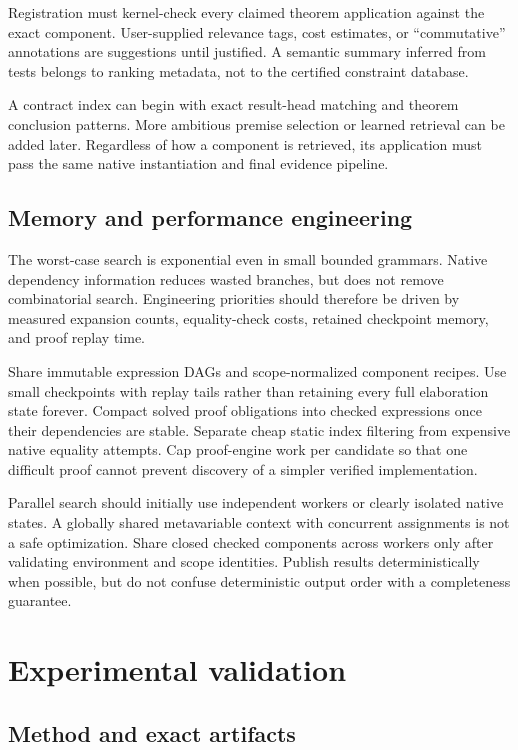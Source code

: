\documentclass[11pt,a4paper]{article}
\theoremstyle{remark}
\begin{document}
Registration must kernel-check every claimed theorem application against the exact component. User-supplied relevance tags, cost estimates, or ``commutative'' annotations are suggestions until justified. A semantic summary inferred from tests belongs to ranking metadata, not to the certified constraint database.

A contract index can begin with exact result-head matching and theorem conclusion patterns. More ambitious premise selection or learned retrieval can be added later. Regardless of how a component is retrieved, its application must pass the same native instantiation and final evidence pipeline.

\subsection{Memory and performance engineering}

The worst-case search is exponential even in small bounded grammars. Native dependency information reduces wasted branches, but does not remove combinatorial search. Engineering priorities should therefore be driven by measured expansion counts, equality-check costs, retained checkpoint memory, and proof replay time.

Share immutable expression DAGs and scope-normalized component recipes. Use small checkpoints with replay tails rather than retaining every full elaboration state forever. Compact solved proof obligations into checked expressions once their dependencies are stable. Separate cheap static index filtering from expensive native equality attempts. Cap proof-engine work per candidate so that one difficult proof cannot prevent discovery of a simpler verified implementation.

Parallel search should initially use independent workers or clearly isolated native states. A globally shared metavariable context with concurrent assignments is not a safe optimization. Share closed checked components across workers only after validating environment and scope identities. Publish results deterministically when possible, but do not confuse deterministic output order with a completeness guarantee.

\section{Experimental validation}\label{sec:experiments}

\subsection{Method and exact artifacts}
\end{document}
